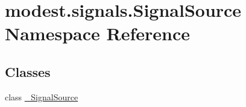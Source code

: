 \hypertarget{namespacemodest_1_1signals_1_1SignalSource}{}\section{modest.\+signals.\+Signal\+Source Namespace Reference}
\label{namespacemodest_1_1signals_1_1SignalSource}
\subsection*{Classes}
\begin{DoxyCompactItemize}
\item 
class \hyperlink{classmodest_1_1signals_1_1SignalSource_1_1__SignalSource}{\+\_\+\+Signal\+Source}
\end{DoxyCompactItemize}
